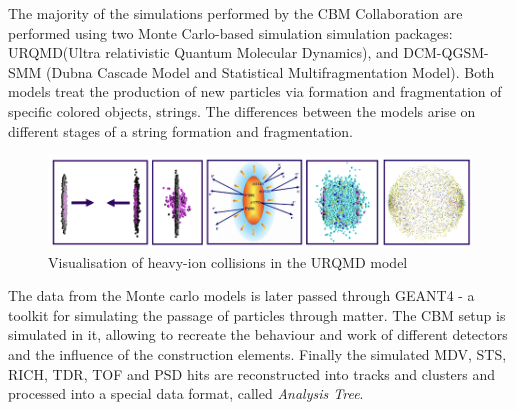 The majority of the simulations performed by the CBM Collaboration are performed using two Monte Carlo-based simulation simulation packages: URQMD(Ultra relativistic Quantum Molecular Dynamics)\cite{urqmd}, and DCM-QGSM-SMM (Dubna Cascade Model and Statistical Multifragmentation Model)\cite{dcm}. Both models  treat the production of new particles via formation and fragmentation of specific colored objects, strings. The differences between the models arise on different stages of a string formation and fragmentation.\cite{dcm}

\begin{figure}[H]
    \centering
    \includegraphics[width=.9\textwidth]{img/urqmd.png}
    \caption{Visualisation of heavy-ion collisions in the URQMD model\cite{slodkowski}}
    \label{fair map}
\end{figure}

The data from the Monte carlo models is later passed through GEANT4 - a toolkit for simulating the passage of particles through matter.\cite{geant4} The CBM setup is simulated in it, allowing to recreate the behaviour and work of different detectors and the influence of the construction elements. Finally the simulated MDV, STS, RICH, TDR, TOF and PSD hits are reconstructed into tracks and clusters and processed into a special data format, called \emph{Analysis Tree}\cite{atree}.


